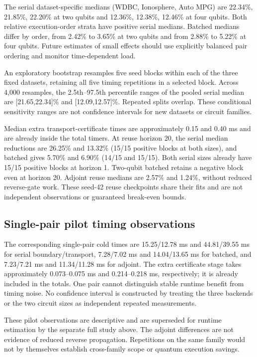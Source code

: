 The serial dataset-specific medians (WDBC, Ionosphere, Auto MPG) are
22.34\%, 21.85\%, 22.20\% at two qubits and 12.36\%, 12.38\%,
12.46\% at four qubits. Both relative execution-order strata have
positive serial medians. Batched medians differ by order, from
2.42\% to 3.65\% at two qubits and from 2.88\% to 5.22\% at four
qubits. Future estimates of small effects should use explicitly
balanced pair ordering and monitor time-dependent load.

An exploratory bootstrap resamples five seed blocks within each of
the three fixed datasets, retaining all five timing repetitions in a
selected block. Across 4,000 resamples, the 2.5th--97.5th percentile
ranges of the pooled serial median are [21.65,22.34]\% and
[12.09,12.57]\%. Repeated splits overlap. These conditional sensitivity
ranges are not confidence intervals for new datasets or circuit families.

Median extra transport-certificate times are approximately 0.15 and
0.40 ms and are already inside the total timers. At reuse horizon 20,
the serial median reductions are 26.25\% and 13.32\% (15/15 positive
blocks at both sizes), and batched gives 5.70\% and 6.90\% (14/15
and 15/15). Both serial sizes already have 15/15 positive blocks at
horizon 1. Two-qubit batched retains a negative block even at horizon
20. Adjoint reuse medians are 2.57\% and 1.24\%, without reduced
reverse-gate work. These seed-42 reuse checkpoints share their fits
and are not independent observations or guaranteed break-even bounds.

\subsection{Single-pair pilot timing observations}
\label{app:pilot_time}
The corresponding single-pair cold times are 15.25/12.78 ms and
44.81/39.55 ms for serial boundary/transport, 7.28/7.02 ms and
14.04/13.65 ms for batched, and 7.23/7.21 ms and 11.34/11.28 ms for
adjoint. The extra certificate stage takes approximately 0.073--0.075 ms
and 0.214--0.218 ms, respectively; it is already included in the totals.
One pair cannot distinguish stable runtime benefit from timing noise.
No confidence interval is constructed by treating the three backends
or the two circuit sizes as independent repeated measurements.

These pilot observations are descriptive and are superseded for runtime
estimation by the separate full study above. The adjoint differences are not evidence of
reduced reverse propagation. Repetitions on the same family would not
by themselves establish cross-family scope or quantum execution savings.

